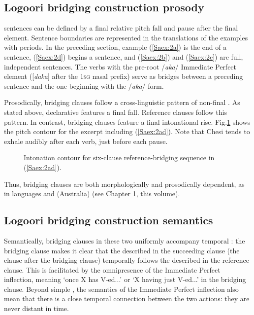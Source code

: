 \documentclass[output=paper]{LSP/langsci}
\begin{document}
\subsection{Logoori bridging construction prosody}
\label{Saprosody}
  sentences can be defined by a final relative pitch fall and pause after the final element. Sentence boundaries are represented in the translations of the examples with periods. In the preceding section, example (\ref{Saex:2a}) is the end of a  sentence, (\ref{Saex:2d}) begins a  sentence, and (\ref{Saex:2b}) and (\ref{Saex:2c}) are full, independent  sentences. The verbs with the pre-root /\textit{aka}/ Immediate Perfect element ([\textit{daka}] after the \textsc{1sg} nasal prefix) serve as bridges between a preceding  sentence and the one beginning with the /\textit{aka}/ form. 

Prosodically,  bridging clauses follow a cross-linguistic pattern of non-final  \citep{devries.2005}. As stated above,  declarative  features a final fall. Reference clauses follow this pattern. In contrast, bridging clauses feature a final intonational rise. Fig.\ref{SaFig1} shows the pitch contour for the excerpt including (\ref{Saex:2ad}). Note that Chesi tends to exhale audibly after each verb, just before each pause.
%


\begin{figure}[ht]
\caption{Intonation contour for six-clause reference-bridging sequence in (\ref{Saex:2ad}). \label{SaFig1}}
\end{figure}

Thus,  bridging clauses are both morphologically  and prosodically dependent, as in  languages and  (Australia) (see Chapter 1, this volume).

\subsection{Logoori bridging construction semantics}
\label{Sasemantics}
Semantically,  bridging clauses in these two  uniformly accompany temporal : the bridging clause makes it clear that the  described in the succeeding clause (the clause after the bridging clause) temporally follows the  described in the reference clause. This is facilitated by the omnipresence of the Immediate Perfect inflection, meaning `once X has V-ed...' or `X having just V-ed...' in the bridging clause. Beyond simple , the semantics of the Immediate Perfect inflection also mean that there is a close temporal connection between the two actions: they are never distant in time.
\end{document}

